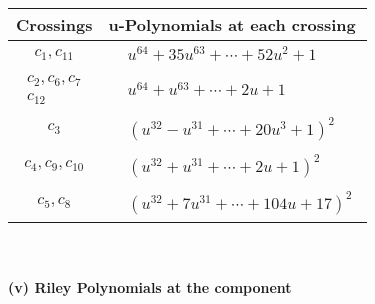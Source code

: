 \documentclass[1p]{elsarticle_modified}
\theoremstyle{definition}
\begin{document}
\begin{tabular}{m{50pt}|m{274pt}}
Crossings & \hspace{64pt}u-Polynomials at each crossing \\
\hline $$\begin{aligned}c_{1},c_{11}\end{aligned}$$&$\begin{aligned}
&u^{64}+35 u^{63}+\cdots+52 u^2+1
\end{aligned}$\\
\hline $$\begin{aligned}c_{2},c_{6},c_{7}\\c_{12}\end{aligned}$$&$\begin{aligned}
&u^{64}+u^{63}+\cdots+2 u+1
\end{aligned}$\\
\hline $$\begin{aligned}c_{3}\end{aligned}$$&$\begin{aligned}
&(u^{32}- u^{31}+\cdots+20 u^3+1)^{2}
\end{aligned}$\\
\hline $$\begin{aligned}c_{4},c_{9},c_{10}\end{aligned}$$&$\begin{aligned}
&(u^{32}+u^{31}+\cdots+2 u+1)^{2}
\end{aligned}$\\
\hline $$\begin{aligned}c_{5},c_{8}\end{aligned}$$&$\begin{aligned}
&(u^{32}+7 u^{31}+\cdots+104 u+17)^{2}
\end{aligned}$\\
\hline
\end{tabular}\\~\\
\newpage\renewcommand{\arraystretch}{1}
\flushleft \textbf{(v) Riley Polynomials at the component}\newline \\
\end{document}

